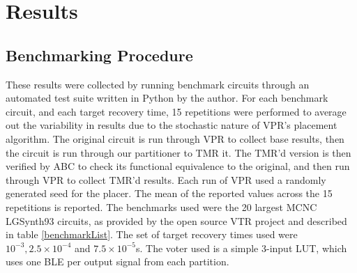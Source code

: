 \documentclass[12pt,final,oneside]{dwThesis} %
\begin{document}
   \chapter{Results} \section{Benchmarking Procedure} These results were
   collected by running benchmark circuits through an automated test suite
   written in Python by the author. For each benchmark circuit, and each target
   recovery time, 15 repetitions were performed to average out the variability
   in results due to the stochastic nature of \gls{VPR}'s placement algorithm.
   The original circuit is run through VPR to collect base results, then the
   circuit is run through our partitioner to TMR it. The TMR'd version is then
   verified by \gls{ABC} to check its functional equivalence to the original,
   and then run through VPR to collect TMR'd results. Each run of VPR used a
   randomly generated seed for the placer.  The mean of the reported values
   across the 15 repetitions is reported.  The benchmarks used were the 20
   largest \gls{MCNC} LGSynth93 circuits, as provided by the open source
   \gls{VTR} project  and described in table
   \ref{benchmarkList}.  The set of target recovery times used were $10^{-3},
   2.5\times10^{-4}$ and $7.5\times10^{-5}$s.  The voter used is a simple
   3-input \gls{LUT}, which uses one \gls{BLE} per output signal from each
   partition.
\end{document}
